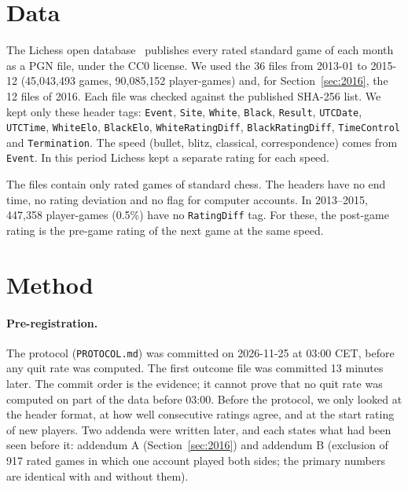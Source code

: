 \documentclass[11pt]{article}
\begin{document}
\section{Data}

The Lichess open database~\cite{lichessdb} publishes every rated standard game of each month as a PGN file, under the CC0 license. We used the 36 files from 2013-01 to 2015-12 (45,043,493 games, 90,085,152 player-games) and, for Section~\ref{sec:2016}, the 12 files of 2016. Each file was checked against the published SHA-256 list. We kept only these header tags: \texttt{Event}, \texttt{Site}, \texttt{White}, \texttt{Black}, \texttt{Result}, \texttt{UTCDate}, \texttt{UTCTime}, \texttt{WhiteElo}, \texttt{BlackElo}, \texttt{WhiteRatingDiff}, \texttt{BlackRatingDiff}, \texttt{TimeControl} and \texttt{Termination}. The speed (bullet, blitz, classical, correspondence) comes from \texttt{Event}. In this period Lichess kept a separate rating for each speed.

The files contain only rated games of standard chess. The headers have no end time, no rating deviation and no flag for computer accounts. In 2013--2015, 447,358 player-games (0.5\%) have no \texttt{RatingDiff} tag. For these, the post-game rating is the pre-game rating of the next game at the same speed.

\section{Method}\label{sec:method}

\paragraph{Pre-registration.} The protocol (\texttt{PROTOCOL.md}) was committed on 2026-11-25 at 03:00 CET, before any quit rate was computed. The first outcome file was committed 13 minutes later. The commit order is the evidence; it cannot prove that no quit rate was computed on part of the data before 03:00. Before the protocol, we only looked at the header format, at how well consecutive ratings agree, and at the start rating of new players. Two addenda were written later, and each states what had been seen before it: addendum A (Section~\ref{sec:2016}) and addendum B (exclusion of 917 rated games in which one account played both sides; the primary numbers are identical with and without them).
\end{document}
